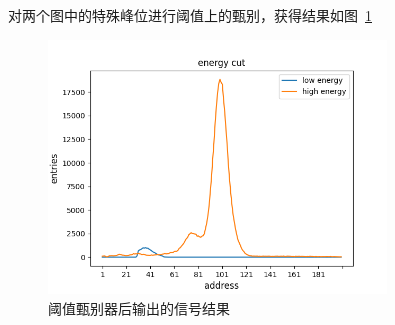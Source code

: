 \documentclass[12pt]{ctexart}
\begin{document}
对两个图中的特殊峰位进行阈值上的甄别，获得结果如图~\ref{fig:energyCut}
\begin{figure}
    \centering
    \includegraphics[width=0.8\textwidth]{data/energyCut.png}
    \caption{阈值甄别器后输出的信号结果}
    \label{fig:energyCut}
\end{figure}
\end{document}
